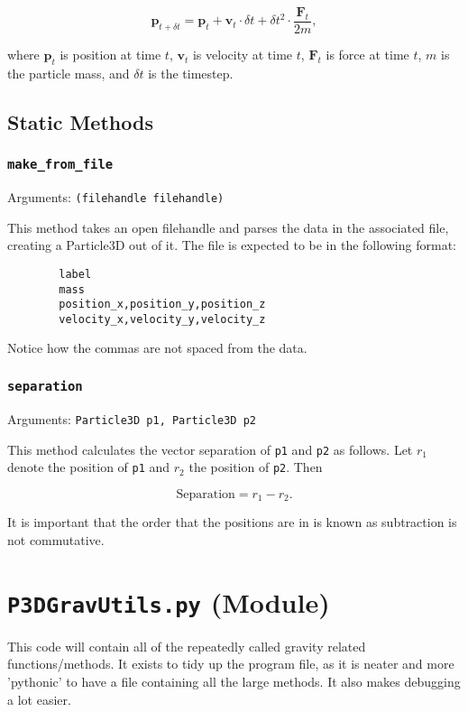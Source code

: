 \documentclass[a4paper, 11pt, british, left=1in, right=1in, top=0.3in, bottom=1in]{article}
\begin{document}
	$$\textbf{p}_{t+\delta t} = \textbf{p}_t + \textbf{v}_t\cdot\delta t + \delta t^2 \cdot \frac{\textbf{F}_t}{2m},$$
	
	where $\textbf{p}_t$ is position at time $t$, $\textbf{v}_t$ is velocity at time $t$, $\textbf{F}_t$ is force at time $t$, $m$ is the particle mass, and $\delta t$ is the timestep. 
\pagebreak
	\subsection{Static Methods}
	
	\subsubsection{\texttt{make\_from\_file}}
	
	Arguments: \texttt{(filehandle filehandle)}
	
	This method takes an open filehandle and parses the data in the associated file, creating a Particle3D out of it. The file is expected to be in the following format:
	
	\begin{verbatim}
		label
		mass
		position_x,position_y,position_z
		velocity_x,velocity_y,velocity_z
	\end{verbatim}
	
	Notice how the commas are not spaced from the data.
	
	\subsubsection{\texttt{separation}}
	
	Arguments: \texttt{Particle3D p1, Particle3D p2}
	
	This method calculates the vector separation of \texttt{p1} and \texttt{p2} as follows. Let $r_1$ denote the position of \texttt{p1} and $r_2$ the position of \texttt{p2}. Then
	
	$$\text{Separation} = r_1 - r_2.$$
	
	It is important that the order that the positions are in is known as subtraction is not commutative. 
	
	\pagebreak
	
	\section{\texttt{P3DGravUtils.py} (Module)}
	
	This code will contain all of the repeatedly called gravity related functions/methods. It exists to tidy up the program file, as it is neater and more 'pythonic' to have a file containing all the large methods. It also makes debugging a lot easier. 
	
\end{document}
